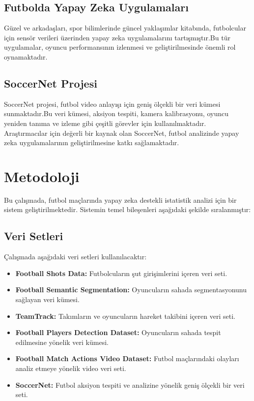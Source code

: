 \documentclass[a4paper,12pt]{article}
\begin{document}
	\subsection{Futbolda Yapay Zeka Uygulamaları}
	
	Güzel ve arkadaşları, spor bilimlerinde güncel yaklaşımlar kitabında, futbolcular için sensör verileri üzerinden yapay zeka uygulamalarını tartışmıştır\cite{guzel2022yapay}.Bu tür uygulamalar, oyuncu performansının izlenmesi ve geliştirilmesinde önemli rol oynamaktadır. 
	
	\subsection{SoccerNet Projesi}
	
	SoccerNet projesi, futbol video anlayışı için geniş ölçekli bir veri kümesi sunmaktadır\cite{soccer-net}.Bu veri kümesi, aksiyon tespiti, kamera kalibrasyonu, oyuncu yeniden tanıma ve izleme gibi çeşitli görevler için kullanılmaktadır. Araştırmacılar için değerli bir kaynak olan SoccerNet, futbol analizinde yapay zeka uygulamalarının geliştirilmesine katkı sağlamaktadır.
	
	\section{Metodoloji}
	Bu çalışmada, futbol maçlarında yapay zeka destekli istatistik analizi için bir sistem geliştirilmektedir. Sistemin temel bileşenleri aşağıdaki şekilde sıralanmıştır:
	
	\subsection{Veri Setleri}
	Çalışmada aşağıdaki veri setleri kullanılacaktır:
	\begin{itemize}
		\item \textbf{Football Shots Data:} Futbolcuların şut girişimlerini içeren veri seti.
		\item \textbf{Football Semantic Segmentation:} Oyuncuların sahada segmentasyonunu sağlayan veri kümesi.
		\item \textbf{TeamTrack:} Takımların ve oyuncuların hareket takibini içeren veri seti.
		\item \textbf{Football Players Detection Dataset:} Oyuncuların sahada tespit edilmesine yönelik veri kümesi.
		\item \textbf{Football Match Actions Video Dataset:} Futbol maçlarındaki olayları analiz etmeye yönelik video veri seti.
		\item \textbf{SoccerNet:} Futbol aksiyon tespiti ve analizine yönelik geniş ölçekli bir veri seti.
	\end{itemize}
	
\end{document}
